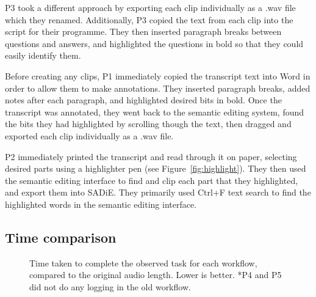 P3 took a different approach by exporting each clip individually as a .wav file
which they renamed.  Additionally, P3 copied the text from each clip into the
script for their programme. They then inserted paragraph breaks between
questions and answers, and highlighted the questions in bold so that they could
easily identify them.


Before creating any clips, P1 immediately copied the transcript text into Word
in order to allow them to make annotations. They inserted paragraph breaks,
added notes after each paragraph, and highlighted desired bits in bold. Once
the transcript was annotated, they went back to the semantic editing system,
found the bits they had highlighted by scrolling though the text, then dragged
and exported each clip individually as a .wav file.

P2 immediately printed the transcript and read through it on paper, selecting
desired parts using a highlighter pen (see Figure~\ref{fig:highlight}). They
then used the semantic editing interface to find and clip each part that they
highlighted, and export them into SADiE.  They primarily used Ctrl+F text
search to find the highlighted words in the semantic editing interface.



\subsection{Time comparison}

\begin{figure}
\centering
  \caption{Time taken to complete the observed task for each workflow, compared
    to the original audio length. Lower is better. *P4 and P5 did not do any
    logging in the old workflow.}
  \label{fig:time}
\end{figure}


